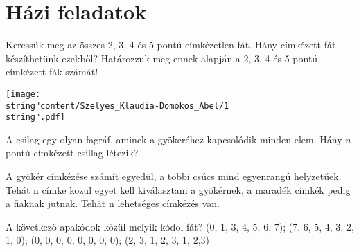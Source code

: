 \section*{Házi feladatok}
\begin{problem}
	Keressük meg az összes 2, 3, 4 és 5 pontú címkézetlen fát. Hány címkézett
	fát készíthetünk ezekből? Határozzuk meg ennek alapján a 2, 3, 4 és
	5 pontú címkézett fák számát! 
\end{problem}

\begin{solution}
	\begin{center}
		\texttt{[image: \\string"content/Szelyes\_Klaudia-Domokos\_Abel/1\\string".pdf]} 
		\par\end{center}
\end{solution}
\begin{problem}
	A csilag egy olyan fagráf, aminek a gyökeréhez kapcsolódik minden
	elem. Hány $n$ pontú címkézett csillag létezik? 
\end{problem}

\begin{solution}
	A gyökér címkézése számít egyedül, a többi csúcs mind egyenrangú helyzetűek.
	Tehát n címke közül egyet kell kiválasztani a gyökérnek, a maradék
	címkék pedig a fiaknak jutnak. Tehát n lehetséges címkézés van. 
\end{solution}
\begin{problem}
	A következő apakódok közül melyik kódol fát? (0, 1, 3, 4, 5, 6, 7);
	(7, 6, 5, 4, 3, 2, 1, 0); (0, 0, 0, 0, 0, 0, 0, 0); (2, 3, 1, 2, 3,
	1, 2,3) 
\end{problem}

